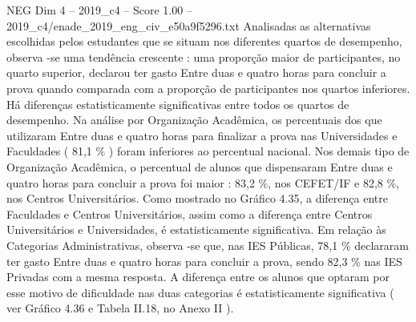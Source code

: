 \begin{textsample}{NEG Dim 4 – 2019\_c4 – Score 1.00 – 2019\_c4/enade\_2019\_eng\_civ\_e50a9f5296.txt}
Analisadas as alternativas escolhidas pelos estudantes que se situam nos diferentes quartos de desempenho, observa -se uma tendência crescente : uma proporção maior de participantes, no quarto superior, declarou ter gasto Entre duas e quatro horas para concluir a prova quando comparada com a proporção de participantes nos quartos inferiores.
Há diferenças estatisticamente significativas entre todos os quartos de desempenho.
Na análise por Organização Acadêmica, os percentuais dos que utilizaram Entre duas e quatro horas para finalizar a prova nas Universidades e Faculdades ( 81,1 \% ) foram inferiores ao percentual nacional.
Nos demais tipo de Organização Acadêmica, o percentual de alunos que dispensaram Entre duas e quatro horas para concluir a prova foi maior : 83,2 \%, nos CEFET/IF e 82,8 \%, nos Centros Universitários.
Como mostrado no Gráfico 4.35, a diferença entre Faculdades e Centros Universitários, assim como a diferença entre Centros Universitários e Universidades, é estatisticamente significativa.
Em relação às Categorias Administrativas, observa -se que, nas IES Públicas, 78,1 \% declararam ter gasto Entre duas e quatro horas para concluir a prova, sendo 82,3 \% nas IES Privadas com a mesma resposta.
A diferença entre os alunos que optaram por esse motivo de dificuldade nas duas categorias é estatisticamente significativa ( ver Gráfico 4.36 e Tabela II.18, no Anexo II ).

\end{textsample}
